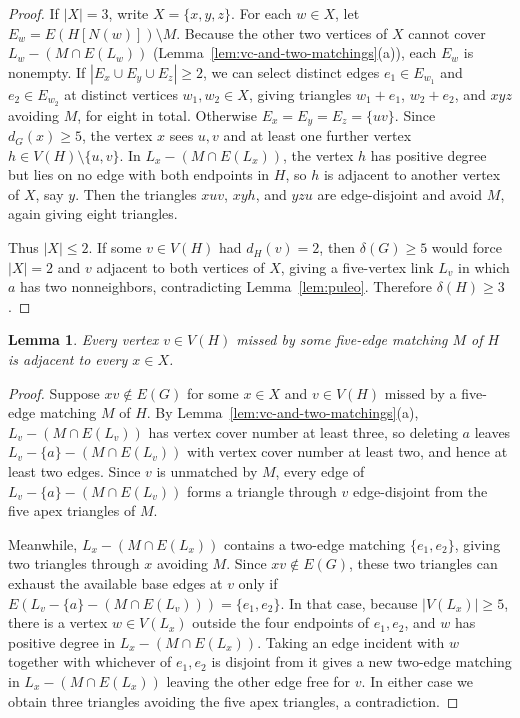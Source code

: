 \documentclass[11pt]{article}
\newtheorem{lemma}[theorem]{Lemma}
\begin{document}
\begin{proof}
If $|X|=3$, write $X=\{x,y,z\}$. For each $w\in X$, let $E_w=E(H[N(w)])\setminus M$. Because the other two vertices of $X$ cannot cover $L_w-(M\cap E(L_w))$ (Lemma~\ref{lem:vc-and-two-matchings}(a)), each $E_w$ is nonempty. If $|E_x\cup E_y\cup E_z|\geq 2$, we can select distinct edges $e_1\in E_{w_1}$ and $e_2\in E_{w_2}$ at distinct vertices $w_1,w_2\in X$, giving triangles $w_1+e_1$, $w_2+e_2$, and $xyz$ avoiding $M$, for eight in total. Otherwise $E_x=E_y=E_z=\{uv\}$. Since $d_G(x)\geq 5$, the vertex $x$ sees $u,v$ and at least one further vertex $h\in V(H)\setminus\{u,v\}$. In $L_x-(M\cap E(L_x))$, the vertex $h$ has positive degree but lies on no edge with both endpoints in $H$, so $h$ is adjacent to another vertex of $X$, say $y$. Then the triangles $xuv$, $xyh$, and $yzu$ are edge-disjoint and avoid $M$, again giving eight triangles.

Thus $|X|\leq 2$. If some $v\in V(H)$ had $d_H(v)=2$, then $\delta(G)\geq 5$ would force $|X|=2$ and $v$ adjacent to both vertices of $X$, giving a five-vertex link $L_v$ in which $a$ has two nonneighbors, contradicting Lemma~\ref{lem:puleo}. Therefore $\delta(H)\geq 3$.
\end{proof}

\begin{lemma}\label{lem:exposable-sees-X}
Every vertex $v\in V(H)$ missed by some five-edge matching $M$ of $H$ is adjacent to every $x\in X$.
\end{lemma}

\begin{proof}
Suppose $xv\notin E(G)$ for some $x\in X$ and $v\in V(H)$ missed by a five-edge matching $M$ of $H$. By Lemma~\ref{lem:vc-and-two-matchings}(a), $L_v-(M\cap E(L_v))$ has vertex cover number at least three, so deleting $a$ leaves $L_v-\{a\}-(M\cap E(L_v))$ with vertex cover number at least two, and hence at least two edges. Since $v$ is unmatched by $M$, every edge of $L_v-\{a\}-(M\cap E(L_v))$ forms a triangle through $v$ edge-disjoint from the five apex triangles of $M$.

Meanwhile, $L_x-(M\cap E(L_x))$ contains a two-edge matching $\{e_1,e_2\}$, giving two triangles through $x$ avoiding $M$. Since $xv\notin E(G)$, these two triangles can exhaust the available base edges at $v$ only if $E(L_v-\{a\}-(M\cap E(L_v)))=\{e_1,e_2\}$. In that case, because $|V(L_x)|\geq 5$, there is a vertex $w\in V(L_x)$ outside the four endpoints of $e_1,e_2$, and $w$ has positive degree in $L_x-(M\cap E(L_x))$. Taking an edge incident with $w$ together with whichever of $e_1,e_2$ is disjoint from it gives a new two-edge matching in $L_x-(M\cap E(L_x))$ leaving the other edge free for $v$. In either case we obtain three triangles avoiding the five apex triangles, a contradiction.
\end{proof}
\end{document}
